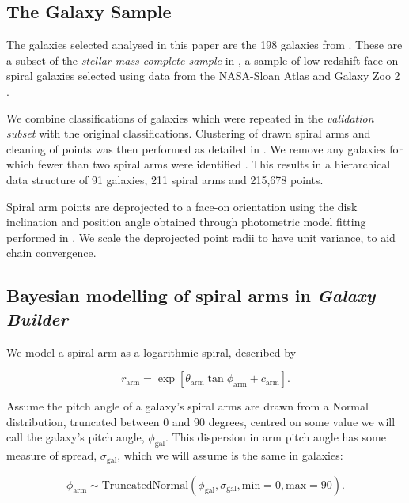 \subsection{The Galaxy Sample}
The galaxies selected analysed in this paper are the 198 galaxies from \Lingard. These are a subset of the \textit{stellar mass-complete sample} in \citet{2017MNRAS.472.2263H}, a sample of low-redshift face-on spiral galaxies selected using data from the NASA-Sloan Atlas \citep{2011AJ....142...31B} and Galaxy Zoo 2 \citep{Willett2013:1308.3496v2}.

We combine classifications of galaxies which were repeated in the \textit{validation subset} with the original classifications. Clustering of drawn spiral arms and cleaning of points was then performed as detailed in \Lingard. We remove any galaxies for which fewer than two spiral arms were identified . This results in a hierarchical data structure of 91 galaxies, 211 spiral arms and 215,678 points.

Spiral arm points are deprojected to a face-on orientation using the disk inclination and position angle obtained through photometric model fitting performed in \Lingard. We scale the deprojected point radii to have unit variance, to aid chain convergence.

\subsection{Bayesian modelling of spiral arms in \textit{Galaxy Builder}}

We model a spiral arm as a logarithmic spiral, described by

\begin{equation}
r_\mathrm{arm} = \exp\left[\theta_\mathrm{arm}\tan\phi_\mathrm{arm} + c_\mathrm{arm}\right].
\end{equation}

Assume the pitch angle of a galaxy's spiral arms are drawn from a Normal distribution, truncated between 0 and 90 degrees, centred on some value we will call the galaxy's pitch angle, $\phi_\mathrm{gal}$. This dispersion in arm pitch angle has some measure of spread, $\sigma_\mathrm{gal}$, which we will assume is the same in galaxies:

\begin{equation}
\phi_\mathrm{arm} \sim \mathrm{TruncatedNormal}(\phi_\mathrm{gal}, \sigma_\mathrm{gal}, \mathrm{min}=0, \mathrm{max}=90).
\end{equation}

